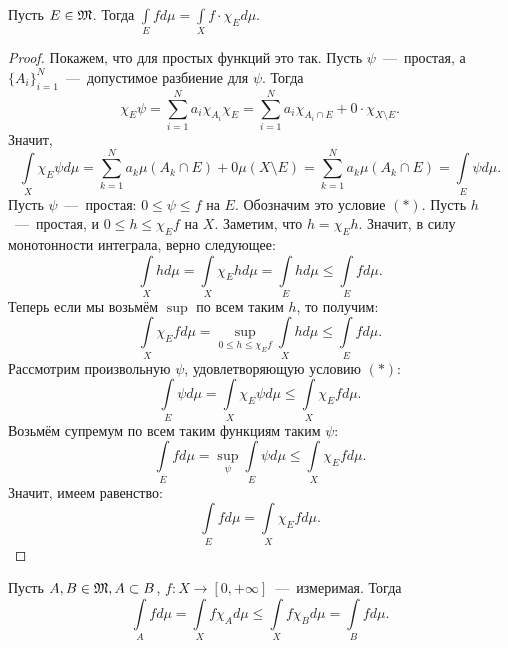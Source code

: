 \begin{proposition}
    Пусть $E \in \mathfrak{M}$. Тогда $\int\limits_E fd\mu = \int\limits_X f \cdot\chi_Ed\mu$.
\end{proposition}
\begin{proof}
    Покажем, что для простых функций это так. Пусть $\psi$~---~простая, а $\{A_i\}_{i = 1}^N$~---~допустимое разбиение для $\psi$. Тогда \[\chi_E\psi = \sum\limits_{i = 1}^N a_i\chi_{A_i}\chi_E = \sum\limits_{i = 1}^N a_i\chi_{A_i \cap E} + 0 \cdot \chi_{X \setminus E}.\] Значит, \[\int\limits_X \chi_E \psi d\mu = \sum\limits_{k = 1}^N a_k \mu(A_k \cap E) + 0\mu(X \setminus E) = \sum\limits_{k = 1}^N a_k\mu(A_k \cap E) = \int\limits_E \psi d \mu.\]
    Пусть $\psi$~---~простая: $0 \leq \psi \leq f$ на $E$. Обозначим это условие $(*)$. Пусть $h$~---~простая, и $0 \leq h \leq \chi_E f$ на $X$.
    Заметим, что $h = \chi_E h$. Значит, в силу монотонности интеграла, верно следующее: \[\int\limits_X hd\mu = \int\limits_X \chi_E h d\mu = \int\limits_E hd\mu \leq \int\limits_E fd\mu.\]
    Теперь если мы возьмём $\sup$ по всем таким $h$, то получим:
    \[\int\limits_X \chi_E fd\mu = \sup\limits_{0\leq h \leq \chi_E f} \int\limits_X hd\mu \leq \int\limits_E fd\mu.\]
    Рассмотрим произвольную $\psi$, удовлетворяющую условию $(*)$:
    \[\int\limits_E \psi d\mu = \int\limits_X \chi_E\psi d\mu \leq \int\limits_X \chi_E fd\mu.\]
    Возьмём супремум по всем таким функциям таким $\psi$:
    \[\int\limits_E fd\mu = \sup\limits_\psi \int\limits_E \psi d\mu \leq \int\limits_X \chi_E fd\mu.\]
    Значит, имеем равенство: \[\int\limits_E fd\mu = \int\limits_X \chi_Efd\mu.\]
\end{proof}
\begin{corollary}
    Пусть $A, B \in \mathfrak{M}, A \subset B$, $f: X \rightarrow [0, +\infty]$~---~измеримая. Тогда \[\int\limits_A fd\mu = \int\limits_X f\chi_Ad\mu \leq \int\limits_X f\chi_Bd\mu = \int\limits_B fd\mu.\]
\end{corollary}

